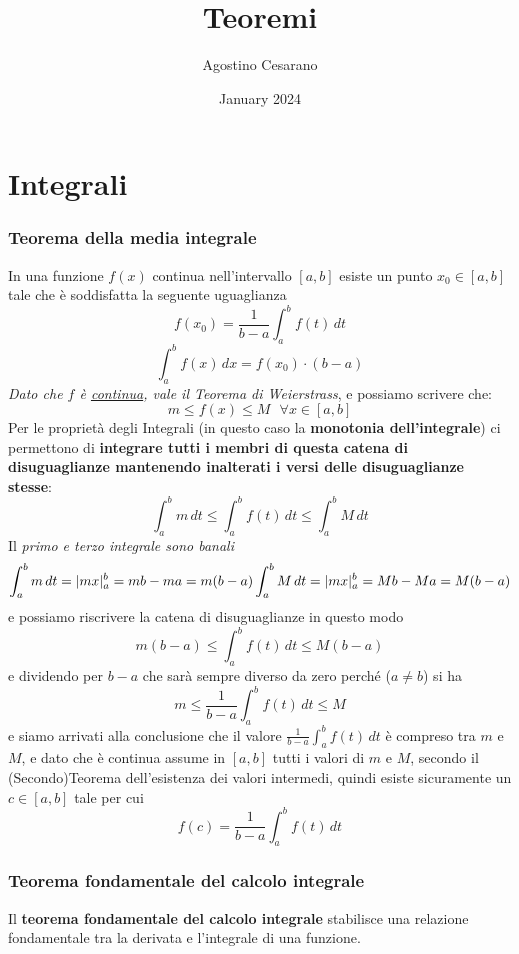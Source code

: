 \documentclass{article}
\title{Teoremi}
\author{Agostino Cesarano}
\date{January 2024}
\begin{document}
\maketitle
{}

\setcounter{part}{3}
\part{Integrali}
\section{Teorema della media integrale}
In una funzione $f(x)$ continua nell'intervallo $[a,b]$ esiste un punto $x_{0}
    \in [a,b]$ tale che è soddisfatta la seguente uguaglianza $$f(x_{0}) =
    \frac{1}{b-a} \int_{a}^{b} f(t) \, dt $$ $$\int_{a}^b f(x) \, dx = f(x_{0})
    \cdot (b-a)$$ \textit{Dato che $f$ è \underline{continua}, vale il Teorema di
    Weierstrass}, e possiamo scrivere che: $$ m \leq f(x) \leq M \text{ } \forall x
    \in [a,b] $$ Per le proprietà degli Integrali (in questo caso la
\textbf{monotonia dell'integrale}) ci permettono di \textbf{integrare tutti i
    membri di questa catena di disuguaglianze mantenendo inalterati i versi delle
    disuguaglianze stesse}: $$ \int_{a}^{b} m \, dt \leq \int_{a}^{b} f(t) \, dt
    \leq \int_{a}^{b} M \, dt $$ Il \textit{primo e terzo integrale sono banali} $$
    \int_{a}^{b} m \, dt = |mx|_{a}^b = mb - ma = m(b-a) \\ \int_{a}^{b} M \, dt =
    |mx|_{a}^b = Mb - Ma = M(b-a) $$ e possiamo riscrivere la catena di
disuguaglianze in questo modo $$ m(b-a) \leq \int_{a}^{b} f(t) \, dt \leq
    M(b-a) $$ e dividendo per $b-a$ che sarà sempre diverso da zero perché ($a \neq
    b$) si ha $$ m \leq \frac{1}{b-a} \int_{a}^b f(t) \, dt \leq M $$ e siamo
arrivati alla conclusione che il valore $\frac{1}{b-a} \int_{a}^b f(t) \, dt$ è
compreso tra $m$ e $M$, e dato che è continua assume in $[a,b]$ tutti i valori
di $m$ e $M$, secondo il (Secondo)Teorema dell'esistenza dei valori intermedi,
quindi esiste sicuramente un $c \in [a,b]$ tale per cui $$ f(c) = \frac{1}{b-a}
    \int_{a}^b f(t) \, dt $$
\section{Teorema fondamentale del calcolo integrale}
Il \textbf{teorema fondamentale del calcolo integrale} stabilisce una relazione
fondamentale tra la derivata e l'integrale di una funzione.
\end{document}
